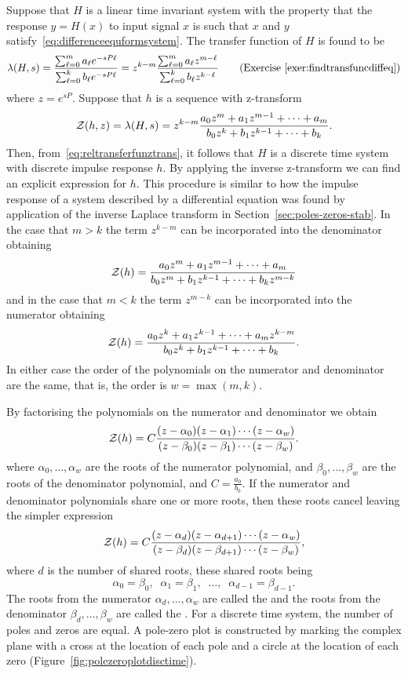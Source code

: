 Suppose that $H$ is a linear time invariant system with the property that the response $y = H(x)$ to input signal $x$ is such that $x$ and $y$ satisfy~\eqref{eq:differenceequformsystem}.  The transfer function of $H$ is found to be
\[
\lambda(H,s) = \frac{\sum_{\ell=0}^{m} a_\ell e^{-sP\ell}}{\sum_{\ell=0}^{k} b_\ell e^{-sP\ell}} = z^{k-m} \frac{\sum_{\ell=0}^{m} a_\ell z^{m-\ell}}{\sum_{\ell=0}^{k} b_\ell z^{k-\ell}} \qquad \text{(Exercise~\ref{exer:findtransfuncdiffeq})}
\]
where $z = e^{sP}$.  Suppose that $h$ is a sequence with z-transform
\[
{\mathcal Z}(h,z) = \lambda(H,s) = z^{k-m}\frac{a_0z^m + a_1 z^{m-1} + \dots + a_m}{b_0z^k + b_1 z^{k-1} + \dots + b_k}.
\]
Then, from~\eqref{eq:reltransferfunztrans}, it follows that $H$ is a discrete time system with discrete impulse response $h$.  By applying the inverse z-transform we can find an explicit expression for $h$.  This procedure is similar to how the impulse response of a system described by a differential equation was found by application of the inverse Laplace transform in Section~\ref{sec:poles-zeros-stab}.  In the case that $m > k$ the term $z^{k-m}$ can be incorporated into the denominator obtaining
\[
{\mathcal Z}(h) = \frac{a_0z^m + a_1 z^{m-1} + \dots + a_m}{b_0z^m + b_1 z^{k-1} + \dots + b_k z^{m-k}}
\]
and in the case that $m < k$ the term $z^{m-k}$ can be incorporated into the numerator obtaining
\[
{\mathcal Z}(h) = \frac{a_0z^k + a_1 z^{k-1} + \dots + a_m z^{k-m}}{b_0z^k + b_1 z^{k-1} + \dots + b_k}.
\] 
In either case the order of the polynomials on the numerator and denominator are the same, that is, the order is $w = \max(m,k)$.

By factorising the polynomials on the numerator and denominator we obtain
\[
{\mathcal Z}(h) = C \frac{(z-\alpha_0)(z - \alpha_1)\cdots(z - \alpha_{w})}{(z-\beta_0)(z - \beta_1)\cdots(z - \beta_{w})}.
\]
where $\alpha_0, \dots, \alpha_w$ are the roots of the numerator polynomial, and $\beta_0, \dots, \beta_w$ are the roots of the denominator polynomial, and $C = \tfrac{a_0}{b_0}$.  If the numerator and denominator polynomials share one or more roots, then these roots cancel leaving the simpler expression
\begin{equation}\label{eq:ztransfuncpoleszeros}
{\mathcal Z}(h) = C \frac{(z-\alpha_d)(z - \alpha_{d+1})\cdots(z - \alpha_{w})}{(z-\beta_d)(z - \beta_{d+1})\cdots(z - \beta_{w})},
\end{equation}
where $d$ is the number of shared roots, these shared roots being 
\[
\alpha_0 = \beta_0, \;\; \alpha_1 = \beta_1, \;\; \dots, \;\;  \alpha_{d-1} = \beta_{d-1}.
\]
The roots from the numerator $\alpha_d, \dots, \alpha_w$ are called the  and the roots from the denominator $\beta_d, \dots, \beta_w$ are called the .  For a discrete time system, the number of poles and zeros are equal.   A pole-zero plot is constructed by marking the complex plane with a cross at the location of each pole and a circle at the location of each zero (Figure~\ref{fig:polezeroplotdisctime}). %

